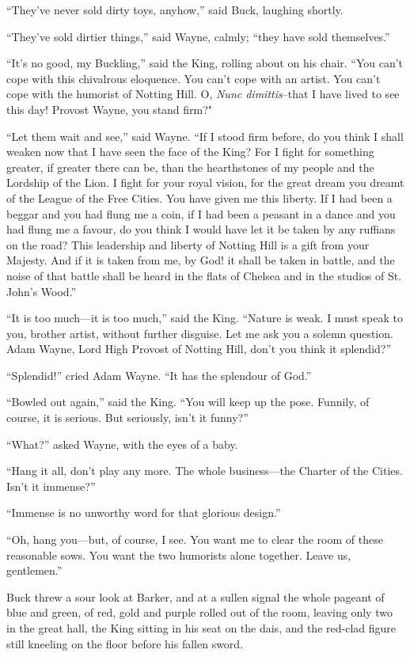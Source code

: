 \documentclass{book}
\begin{document}
“They’ve never sold dirty toys, anyhow,” said Buck, laughing shortly.

“They’ve sold dirtier things,” said Wayne, calmly; “they have sold themselves.”

“It’s no good, my Buckling,” said the King, rolling about on his chair. “You can’t cope with this chivalrous eloquence. You can’t cope with an artist. You can’t cope with the humorist of Notting Hill. O, \emph{Nunc dimittis}–that I have lived to see this day! Provost Wayne, you stand firm?"

“Let them wait and see,” said Wayne. “If I stood firm before, do you think I shall weaken now that I have seen the face of the King? For I fight for something greater, if greater there can be, than the hearthstones of my people and the Lordship of the Lion. I fight for your royal vision, for the great dream you dreamt of the League of the Free Cities. You have given me this liberty. If I had been a beggar and you had flung me a coin, if I had been a peasant in a dance and you had flung me a favour, do you think I would have let it be taken by any ruffians on the road? This leadership and liberty of Notting Hill is a gift from your Majesty. And if it is taken from me, by God! it shall be taken in battle, and the noise of that battle shall be heard in the flats of Chelsea and in the studios of St. John’s Wood.”

“It is too much—it is too much,” said the King. “Nature is weak. I must speak to you, brother artist, without further disguise. Let me ask you a solemn question. Adam Wayne, Lord High Provost of Notting Hill, don’t you think it splendid?”

“Splendid!” cried Adam Wayne. “It has the splendour of God.”

“Bowled out again,” said the King. “You will keep up the pose. Funnily, of course, it is serious. But seriously, isn’t it funny?”

“What?” asked Wayne, with the eyes of a baby.

“Hang it all, don’t play any more. The whole business—the Charter of the Cities. Isn’t it immense?”

“Immense is no unworthy word for that glorious design.”

“Oh, hang you—but, of course, I see. You want me to clear the room of these reasonable sows. You want the two humorists alone together. Leave us, gentlemen.”

Buck threw a sour look at Barker, and at a sullen signal the whole pageant of blue and green, of red, gold and purple rolled out of the room, leaving only two in the great hall, the King sitting in his seat on the dais, and the red-clad figure still kneeling on the floor before his fallen sword.
\end{document}
